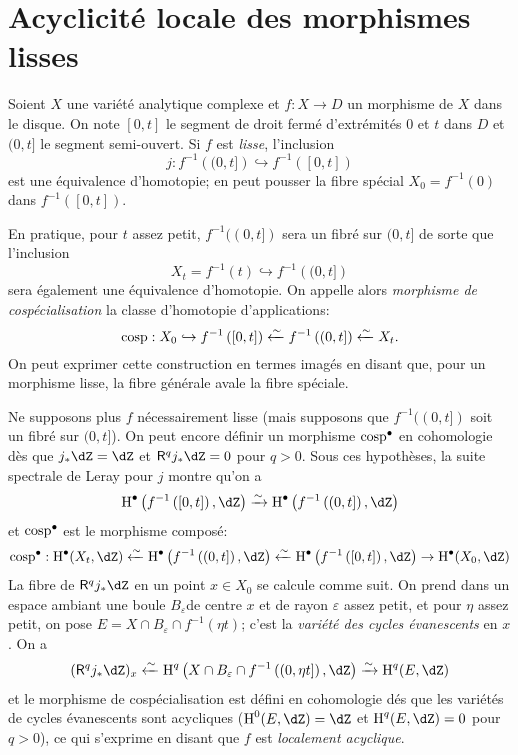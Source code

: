 \section{Acyclicité locale des morphismes lisses}\label{I:5}

Soient $X$ une variété analytique complexe et $f:X\to D$ un morphisme de 
$X$ dans le disque. On note $[0,t]$ le segment de droit fermé d'extrémités 
$0$ et $t$ dans $D$ et $(0,t]$ le segment semi-ouvert. Si $f$ est \emph{lisse}, 
l'inclusion 
\[
  j : f^{-1}\left((0,t]\right) \hookrightarrow f^{-1}\left([0,t]\right)
\]
est une équivalence d'homotopie; en peut pousser la fibre spécial 
$X_0=f^{-1}(0)$ dans $f^{-1}([0,t])$. 

En pratique, pour $t$ assez petit, $f^{-1}((0,t])$ sera un fibré sur 
$(0,t]$ de sorte que l'inclusion 
\[
  X_t = f^{-1}(t) \hookrightarrow f^{-1}\left((0,t]\right)
\]
sera également une équivalence d'homotopie. On appelle alors \emph{morphisme 
de cospécialisation} la classe d'homotopie d'applications: 
\[
  \operatorname{cosp} : X_0 \hookrightarrow f^{-1}\left([0,t]\right) \xleftarrow\sim f^{-1}\left((0,t]\right) \xleftarrow\sim X_t \text{.}
\]
On peut exprimer cette construction en termes imagés en disant que, pour un 
morphisme lisse, la fibre générale avale la fibre spéciale. 

Ne supposons plus $f$ nécessairement lisse (mais supposons que $f^{-1}((0,t])$ 
soit un fibré sur $(0,t]$). On peut encore définir un morphisme 
$\operatorname{cosp}^\bullet$ en cohomologie dès que $j_* \dZ=\dZ$ et 
$\R^q j_* \dZ = 0$ pour $q>0$. Sous ces hypothèses, la suite spectrale de 
Leray pour $j$ montre qu'on a 
\[
  \h^\bullet\left(f^{-1}\left([0,t]\right),\dZ\right) \iso \h^\bullet\left(f^{-1}\left((0,t]\right),\dZ\right)
\]
et $\operatorname{cosp}^\bullet$ est le morphisme composé: 
\[
  \cosp^\bullet : \h^\bullet(X_t,\dZ)
    \xleftarrow\sim \h^\bullet\left(f^{-1}\left((0,t]\right),\dZ\right) 
    \xleftarrow\sim \h^\bullet\left(f^{-1}\left([0,t]\right),\dZ\right) 
    \to \h^\bullet(X_0,\dZ)
\]
La fibre de $\R^q j_* \dZ$ en un point $x\in X_0$ se calcule comme suit. On 
prend dans un espace ambiant une boule $B_\varepsilon$de centre $x$ et de rayon 
$\varepsilon$ assez petit, et pour $\eta$ assez petit, on pose 
$E=X\cap B_\varepsilon \cap f^{-1}(\eta t)$; c'est la \emph{variété des 
cycles évanescents} en $x$. On a 
\[
  (\R^q j_* \dZ)_x \xleftarrow\sim \h^q\left(X\cap B_\varepsilon\cap f^{-1}\left((0,\eta t]\right),\dZ\right) \xrightarrow\sim \h^q(E,\dZ)
\]
et le morphisme de cospécialisation est défini en cohomologie dés que les 
variétés de cycles évanescents sont acycliques ($\h^0(E,\dZ)=\dZ$ et 
$\h^q(E,\dZ) = 0$ pour $q>0$), ce qui s'exprime en disant que $f$ est 
\emph{localement acyclique}. 

